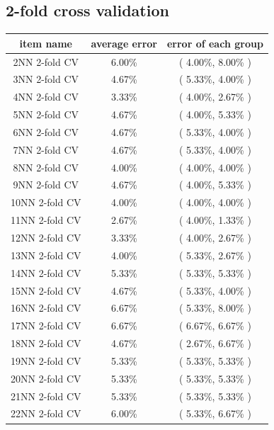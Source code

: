 \documentclass[11pt,a4paper]{article}
\begin{document}
\subsection{2-fold cross validation}
\begin{center}
    \begin{tabular} {|| c | c | c ||}
        \hline
        item name & average error & error of each group \\ \hline
       2NN 2-fold CV & 6.00\% & ( 4.00\%, 8.00\% ) \\ \hline
        3NN 2-fold CV & 4.67\% & ( 5.33\%, 4.00\% ) \\ \hline
        4NN 2-fold CV & 3.33\% & ( 4.00\%, 2.67\% ) \\ \hline
        5NN 2-fold CV & 4.67\% & ( 4.00\%, 5.33\% ) \\ \hline
        6NN 2-fold CV & 4.67\% & ( 5.33\%, 4.00\% ) \\ \hline
        7NN 2-fold CV & 4.67\% & ( 5.33\%, 4.00\% ) \\ \hline
        8NN 2-fold CV & 4.00\% & ( 4.00\%, 4.00\% ) \\ \hline
        9NN 2-fold CV & 4.67\% & ( 4.00\%, 5.33\% ) \\ \hline
        10NN 2-fold CV & 4.00\% & ( 4.00\%, 4.00\% ) \\ \hline
        11NN 2-fold CV & 2.67\% & ( 4.00\%, 1.33\% ) \\ \hline
        12NN 2-fold CV & 3.33\% & ( 4.00\%, 2.67\% ) \\ \hline
        13NN 2-fold CV & 4.00\% & ( 5.33\%, 2.67\% ) \\ \hline
        14NN 2-fold CV & 5.33\% & ( 5.33\%, 5.33\% ) \\ \hline
        15NN 2-fold CV & 4.67\% & ( 5.33\%, 4.00\% ) \\ \hline
        16NN 2-fold CV & 6.67\% & ( 5.33\%, 8.00\% ) \\ \hline
        17NN 2-fold CV & 6.67\% & ( 6.67\%, 6.67\% ) \\ \hline
        18NN 2-fold CV & 4.67\% & ( 2.67\%, 6.67\% ) \\ \hline
        19NN 2-fold CV & 5.33\% & ( 5.33\%, 5.33\% ) \\ \hline
        20NN 2-fold CV & 5.33\% & ( 5.33\%, 5.33\% ) \\ \hline
        21NN 2-fold CV & 5.33\% & ( 5.33\%, 5.33\% ) \\ \hline
        22NN 2-fold CV & 6.00\% & ( 5.33\%, 6.67\% ) \\ \hline

\end{tabular}
\end{center}
\end{document}
